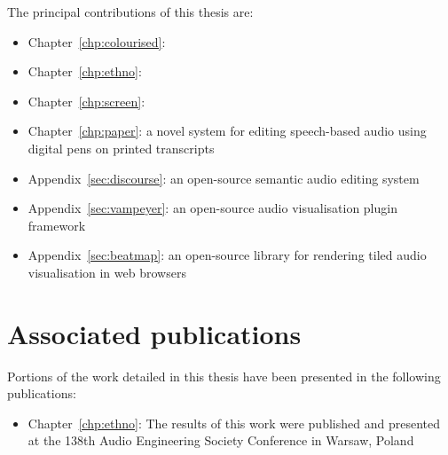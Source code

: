 The principal contributions of this thesis are:
\begin{itemize}
  \item Chapter~\ref{chp:colourised}: 
  \item Chapter~\ref{chp:ethno}: 
  \item Chapter~\ref{chp:screen}: 
  \item Chapter~\ref{chp:paper}: a novel system for editing speech-based audio using digital pens on printed transcripts
  \item Appendix~\ref{sec:discourse}: an open-source semantic audio editing system
  \item Appendix~\ref{sec:vampeyer}: an open-source audio visualisation plugin framework
  \item Appendix~\ref{sec:beatmap}: an open-source library for rendering tiled audio visualisation in web browsers
\end{itemize}

%

\section{Associated publications}\label{sec:intro-publications}

Portions of the work detailed in this thesis have been presented in the following publications:

\begin{itemize}
  \item Chapter~\ref{chp:ethno}: The results of this work were published and presented at the 138th Audio Engineering Society Conference in
    Warsaw, Poland \citep{Baume2015}
\end{itemize}
